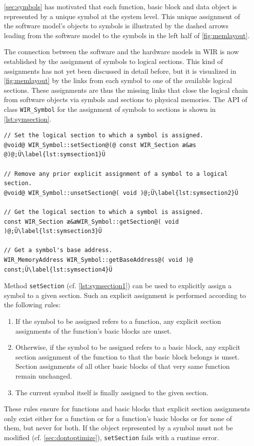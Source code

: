 \cref{sec:symbols} has motivated that each function, basic block and data object is represented by a unique symbol at the system level.
This unique assignment of the software model's objects to symbols is illustrated by the dashed arrows leading from the software model to the symbols in the left half of \cref{fig:memlayout}.

The connection between the software and the hardware models in \gls{WIR} is now established by the assignment of symbols to logical sections.
This kind of assignments has not yet been discussed in detail before, but it is visualized in \cref{fig:memlayout} by the links from each symbol to one of the available logical sections.
These assignments are thus the missing links that close the logical chain from software objects via symbols and sections to physical memories.
The \gls{API} of class \texttt{WIR\_Symbol} for the assignment of symbols to sections is shown in \cref{lst:symsection}.

\begin{lstlisting}[style=code,float=t,caption={Section Handling of Class \texttt{WIR\_Symbol}},label=lst:symsection]
// Set the logical section to which a symbol is assigned.
@void@ WIR_Symbol::setSection@(@ const WIR_Section æ&æs @)@;Ü\label{lst:symsection1}Ü

// Remove any prior explicit assignment of a symbol to a logical section.
@void@ WIR_Symbol::unsetSection@( void )@;Ü\label{lst:symsection2}Ü

// Get the logical section to which a symbol is assigned.
const WIR_Section æ&æWIR_Symbol::getSection@( void )@;Ü\label{lst:symsection3}Ü

// Get a symbol's base address.
WIR_MemoryAddress WIR_Symbol::getBaseAddress@( void )@ const;Ü\label{lst:symsection4}Ü
\end{lstlisting}

Method \texttt{setSection} (cf. \cref{lst:symsection1}) can be used to explicitly assign a symbol to a given section.
Such an explicit assignment is performed according to the following rules:
\begin{enumerate}
  \item If the symbol to be assigned refers to a function, any explicit section assignments of the function's basic blocks are unset.
  \item Otherwise, if the symbol to be assigned refers to a basic block, any explicit section assignment of the function to that the basic block belongs is unset.
  Section assignments of all other basic blocks of that very same function remain unchanged.
  \item The current symbol itself is finally assigned to the given section.
\end{enumerate}
These rules ensure for functions and basic blocks that explicit section assignments only exist either for a function or for a function's basic blocks or for none of them, but never for both.
If the object represented by a symbol must not be modified (cf. \cref{sec:dontoptimize}), \texttt{setSection} fails with a runtime error.

